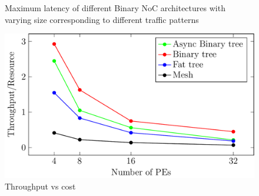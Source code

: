\begin{figure}[t]
\centering     %
{}
\vspace{-3mm}
\caption{Maximum latency of different Binary NoC architectures with varying size corresponding to different traffic patterns}
\vspace{-5mm}
\end{figure}


\begin{figure}[t]
\centering
   \includegraphics[width=0.8\columnwidth]{Data/tputVsCost.pdf}
   \caption{Throughput vs cost}
\end{figure}
